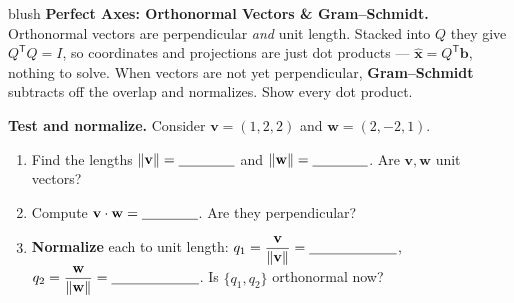 \documentclass[10pt]{article}
\newcommand{\vv}{\mathbf{v}}
\newcommand{\ww}{\mathbf{w}}
\newcommand{\xx}{\mathbf{x}}
\newcommand{\bb}{\mathbf{b}}
\newcommand{\T}{\mathsf{T}}
\begin{document}
\namepartnerperiod

\vspace{0.10in}

\begin{headlinebox}{blush}
\small\textbf{Perfect Axes: Orthonormal Vectors \& Gram--Schmidt.} Orthonormal vectors are perpendicular
\emph{and} unit length. Stacked into $Q$ they give $Q^{\T}Q=I$, so coordinates and projections are just dot
products --- $\hat{\xx}=Q^{\T}\bb$, nothing to solve. When vectors are not yet perpendicular,
\textbf{Gram--Schmidt} subtracts off the overlap and normalizes. Show every dot product.
\end{headlinebox}

\vspace{0.08in}

\begin{tcolorbox}[colback=white, colframe=black!40, title=\textbf{Tier R --- Remediate},
    fonttitle=\bfseries, arc=1.5mm, left=3mm, right=3mm, top=2mm, bottom=2mm, breakable]
\textbf{Test and normalize.} Consider $\vv=(1,2,2)$ and $\ww=(2,-2,1)$.
\begin{enumerate}[leftmargin=1.7em, itemsep=7pt]
  \item Find the lengths $\|\vv\|=\blank{1.4cm}$ and $\|\ww\|=\blank{1.4cm}$. Are $\vv,\ww$ unit vectors?
        \blank{2.2cm}
  \item Compute $\vv\cdot\ww=\blank{1.4cm}$. Are they perpendicular? \blank{2.2cm}
  \item \textbf{Normalize} each to unit length: $q_1=\dfrac{\vv}{\|\vv\|}=\blank{2.2cm}$,\;
        $q_2=\dfrac{\ww}{\|\ww\|}=\blank{2.2cm}$. Is $\{q_1,q_2\}$ orthonormal now? \blank{2.0cm}
\end{enumerate}
\end{tcolorbox}
\end{document}
